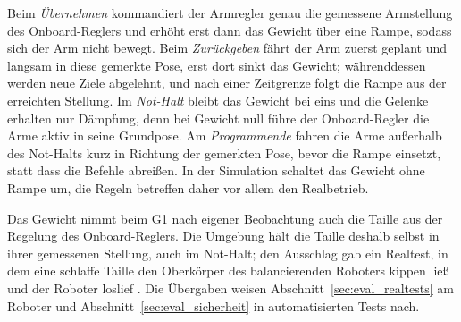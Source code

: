 Beim \emph{Übernehmen} kommandiert der Armregler genau die gemessene Armstellung des Onboard-Reglers und erhöht erst dann das Gewicht über eine Rampe, sodass sich der Arm nicht bewegt.
Beim \emph{Zurückgeben} fährt der Arm zuerst geplant und langsam in diese gemerkte Pose, erst dort sinkt das Gewicht; währenddessen werden neue Ziele abgelehnt, und nach einer Zeitgrenze folgt die Rampe aus der erreichten Stellung.
Im \emph{Not-Halt} bleibt das Gewicht bei eins und die Gelenke erhalten nur Dämpfung, denn bei Gewicht null führe der Onboard-Regler die Arme aktiv in seine Grundpose.
Am \emph{Programmende} fahren die Arme außerhalb des Not-Halts kurz in Richtung der gemerkten Pose, bevor die Rampe einsetzt, statt dass die Befehle abreißen.
In der Simulation schaltet das Gewicht ohne Rampe um, die Regeln betreffen daher vor allem den Realbetrieb.

Das Gewicht nimmt beim G1 nach eigener Beobachtung auch die Taille aus der Regelung des Onboard-Reglers.
Die Umgebung hält die Taille deshalb selbst in ihrer gemessenen Stellung, auch im Not-Halt; den Ausschlag gab ein Realtest, in dem eine schlaffe Taille den Oberkörper des balancierenden Roboters kippen ließ und der Roboter loslief .
Die Übergaben weisen Abschnitt~\ref{sec:eval_realtests} am Roboter und Abschnitt~\ref{sec:eval_sicherheit} in automatisierten Tests nach.
